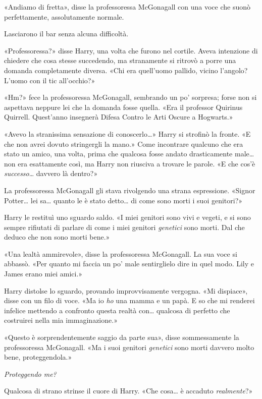 «Andiamo di fretta», disse la professoressa McGonagall con una voce che suonò perfettamente, assolutamente normale.

Lasciarono il bar senza alcuna difficoltà.

«Professoressa?» disse Harry, una volta che furono nel cortile. Aveva intenzione di chiedere che cosa stesse succedendo, ma stranamente si ritrovò a porre una domanda completamente diversa. «Chi era quell’uomo pallido, vicino l’angolo? L’uomo con il tic all’occhio?»

«Hm?» fece la professoressa McGonagall, sembrando un po’ sorpresa; forse non si aspettava neppure lei che la domanda fosse quella. «Era il professor Quirinus Quirrell. Quest’anno insegnerà Difesa Contro le Arti Oscure a Hogwarts.»

«Avevo la stranissima sensazione di conoscerlo…» Harry si strofinò la fronte. «E che non avrei dovuto stringergli la mano.» Come incontrare qualcuno che era stato un amico, una volta, prima che qualcosa fosse andato drasticamente male… non era esattamente così, ma Harry non riusciva a trovare le parole. «E che cos’è \textit{successo}… davvero là dentro?»

La professoressa McGonagall gli stava rivolgendo una strana espressione. «Signor Potter… lei sa… quanto le è stato detto… di come sono morti i suoi genitori?»

Harry le restituì uno sguardo saldo. «I miei genitori sono vivi e vegeti, e si sono sempre rifiutati di parlare di come i miei genitori \textit{genetici} sono morti. Dal che deduco che non sono morti bene.»

«Una lealtà ammirevole», disse la professoressa McGonagall. La sua voce si abbassò. «Per quanto mi faccia un po’ male sentirglielo dire in quel modo. Lily e James erano miei amici.»

Harry distolse lo sguardo, provando improvvisamente vergogna. «Mi dispiace», disse con un filo di voce. «Ma io \textit{ho} una mamma e un papà. E so che mi renderei infelice mettendo a confronto questa realtà con… qualcosa di perfetto che costruirei nella mia immaginazione.»

«Questo è sorprendentemente saggio da parte sua», disse sommessamente la professoressa McGonagall. «Ma i suoi genitori \textit{genetici} sono morti davvero molto bene, proteggendola.»

\textit{Proteggendo me?}

Qualcosa di strano strinse il cuore di Harry. «Che cosa… è accaduto \textit{realmente}?»

